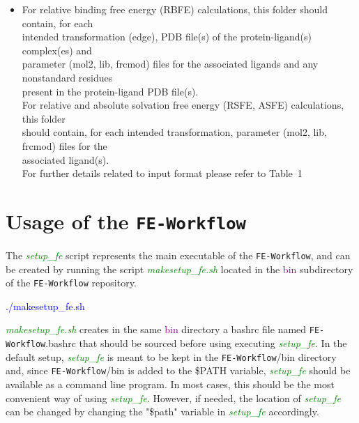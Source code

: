 \documentclass[11pt,letterpaper,titlepage]{article}
\newcommand{\wf}{\texttt{FE-Workflow}}
\begin{document}
\begin{itemize}
		\begin{itemize}
			\item For relative binding free energy (RBFE) calculations, this folder should contain, for each \\
				intended transformation (edge), PDB file(s) of the protein-ligand(s) complex(es) and  \\
				parameter (mol2, lib, frcmod) files for the associated ligands and any nonstandard residues  \\
				present in the protein-ligand PDB file(s).  \\
				For relative and absolute solvation free energy (RSFE, ASFE) calculations, this folder \\
				should contain, for each intended transformation, parameter (mol2, lib, frcmod) files for the  \\
				associated ligand(s). \\
				For further details related to input format please refer to Table~1 \\
		\end{itemize}
\end{itemize}

\vspace{0.1cm}
\section{Usage of the \wf{}}
\vspace{0.1cm}

The \textcolor{green}{\textit{setup\_fe}} script represents the main executable of the \wf{}, 
and can be created by running the script \textcolor{green}{\textit{makesetup\_fe.sh}} located 
in the \textcolor{purple}{bin} subdirectory of the \wf{} repository. 


\vspace{0.1cm}
\centerline{\textcolor{blue}{./makesetup\_fe.sh}}
\vspace{0.1cm}

\textcolor{green}{\textit{makesetup\_fe.sh}} creates in the same \textcolor{purple}{bin} 
directory a bashrc file named \wf{}.bashrc that should be sourced before using executing 
\textcolor{green}{\textit{setup\_fe}}.  
In the default setup, 
\textcolor{green}{\textit{setup\_fe}}
is meant to be kept in the \wf{}/bin directory and, since \wf{}/bin is added to the \$PATH variable, 
\textcolor{green}{\textit{setup\_fe}} should be available as a command line program. In most 
cases, this should be the most convenient way of using \textcolor{green}{\textit{setup\_fe}}. 
However, if needed,
the location of \textcolor{green}{\textit{setup\_fe}} can be changed by changing 
the  "\$path" variable in \textcolor{green}{\textit{setup\_fe}} accordingly.
\end{document}
